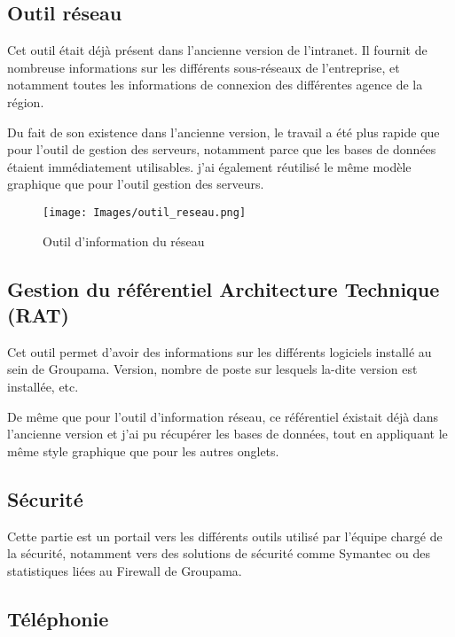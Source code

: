 \subsection{Outil réseau}

Cet outil était déjà présent dans l'ancienne version de l'intranet. Il
fournit de nombreuse informations sur les différents sous-réseaux de
l'entreprise, et notamment toutes les informations de connexion des
différentes agence de la région.

Du fait de son existence dans l'ancienne version, le travail a été
plus rapide que pour l'outil de gestion des serveurs, notamment parce
que les bases de données étaient immédiatement utilisables. j'ai
également réutilisé le même modèle graphique que pour l'outil gestion
des serveurs.

\begin{figure}[h!]
\begin{center}
\texttt{[image: Images/outil\_reseau.png]}
\caption{Outil d'information du réseau}
\label{Outil d'information du réseau}
\end{center}
\end{figure}

\subsection{Gestion du référentiel Architecture Technique (RAT)}

Cet outil permet d'avoir des informations sur les différents logiciels
installé au sein de Groupama. Version, nombre de poste sur lesquels
la-dite version est installée, etc.

De même que pour l'outil d'information réseau, ce référentiel éxistait
déjà dans l'ancienne version et j'ai pu récupérer les bases de
données, tout en appliquant le même style graphique que pour les
autres onglets.


\subsection{Sécurité}

Cette partie est un portail vers les différents outils utilisé par 
l'équipe chargé de la sécurité, notamment vers des solutions de sécurité 
comme Symantec ou des statistiques liées au Firewall de Groupama.

\subsection{Téléphonie}

